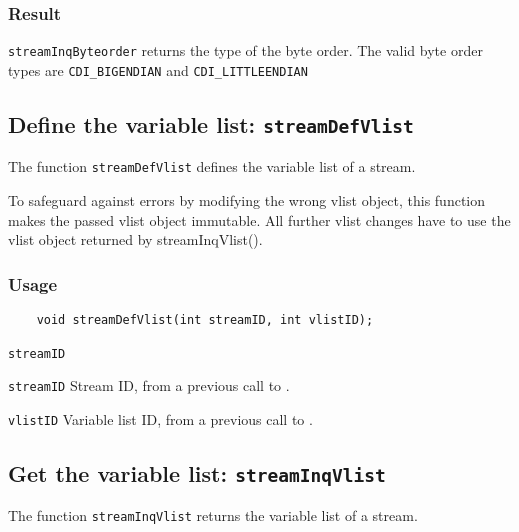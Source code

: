 \subsubsection*{Result}

{\texttt{streamInqByteorder}} returns the type of the byte order.
The valid {\CDI} byte order types are {\texttt{CDI\_BIGENDIAN}} and {\texttt{CDI\_LITTLEENDIAN}}



\subsection{Define the variable list: \texttt{streamDefVlist}}
\label{streamDefVlist}

The function {\texttt{streamDefVlist}} defines the variable list of a stream.

To safeguard against errors by modifying the wrong vlist object,
this function makes the passed vlist object immutable.
All further vlist changes have to use the vlist object returned by streamInqVlist().

\subsubsection*{Usage}

\begin{verbatim}
    void streamDefVlist(int streamID, int vlistID);
\end{verbatim}

\hspace*{4mm}\begin{minipage}[]{15cm}
\begin{deflist}{\texttt{streamID}\ }
\item[\texttt{streamID}]
Stream ID, from a previous call to {}.
\item[\texttt{vlistID}]
Variable list ID, from a previous call to {}.

\end{deflist}
\end{minipage}


\subsection{Get the variable list: \texttt{streamInqVlist}}
\label{streamInqVlist}

The function {\texttt{streamInqVlist}} returns the variable list of a stream.

